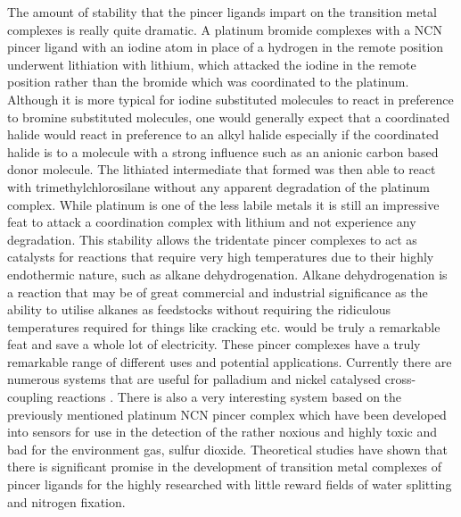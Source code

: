 The amount of stability that the pincer ligands impart on the transition metal complexes is really quite dramatic.  A platinum bromide complexes with a NCN pincer ligand with an iodine atom in place of a hydrogen in the remote position underwent lithiation with \tBu{} lithium, which attacked the iodine in the remote position rather than the bromide which was coordinated to the platinum.  Although it is more typical for iodine substituted molecules to react in preference to bromine substituted molecules, one would generally expect that a coordinated halide would react in preference to an alkyl halide especially if the coordinated halide is \trans{} to a molecule with a strong \trans{} influence such as an anionic carbon based donor molecule.  The lithiated intermediate that formed was then able to react with trimethylchlorosilane without any apparent degradation of the platinum complex.  While platinum is one of the less labile metals it is still an impressive feat to attack a coordination complex with \tBu{} lithium and not experience any degradation.  This stability allows the tridentate pincer complexes to act as catalysts for reactions that require very high temperatures due to their highly endothermic nature, such as alkane dehydrogenation.  Alkane dehydrogenation is a reaction that may be of great commercial and industrial significance as the ability to utilise alkanes as feedstocks without requiring the ridiculous temperatures required for things like cracking etc. would be truly a remarkable feat and save a whole lot of electricity.  These pincer complexes have a truly remarkable range of different uses and potential applications.  Currently there are numerous systems that are useful for palladium and nickel catalysed cross-coupling reactions .  There is also a very interesting system based on the previously mentioned platinum NCN pincer complex which have been developed into sensors for use in the detection of the rather noxious and highly toxic and bad for the environment gas, sulfur dioxide.  Theoretical studies have shown that there is significant promise in the development of transition metal complexes of pincer ligands for the highly researched with little reward fields of water splitting and nitrogen fixation.  

